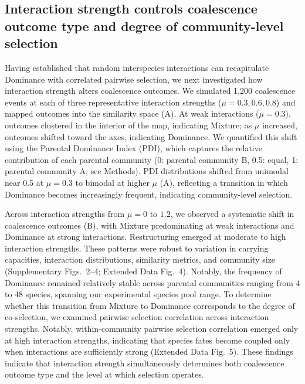 \subsection{Interaction strength controls coalescence outcome type and degree of community-level selection}
\label{sec:results:interaction_strength}

Having established that random interspecies interactions can recapitulate Dominance with correlated pairwise selection, we next investigated how interaction strength alters coalescence outcomes. We simulated 1,200 coalescence events at each of three representative interaction strengths ($\mu = 0.3, 0.6, 0.8$) and mapped outcomes into the similarity space (A). At weak interactions ($\mu = 0.3$), outcomes clustered in the interior of the map, indicating Mixture; as $\mu$ increased, outcomes shifted toward the axes, indicating Dominance. We quantified this shift using the Parental Dominance Index (PDI), which captures the relative contribution of each parental community (0: parental community B, 0.5: equal, 1: parental community A; see Methods). PDI distributions shifted from unimodal near 0.5 at $\mu = 0.3$ to bimodal at higher $\mu$ (A), reflecting a transition in which Dominance becomes increasingly frequent, indicating community-level selection.

Across interaction strengths from $\mu = 0$ to $1.2$, we observed a systematic shift in coalescence outcomes (B), with Mixture predominating at weak interactions and Dominance at strong interactions. Restructuring emerged at moderate to high interaction strengths. These patterns were robust to variation in carrying capacities, interaction distributions, similarity metrics, and community size (Supplementary Figs.~2–4; Extended Data Fig.~4). Notably, the frequency of Dominance remained relatively stable across parental communities ranging from 4 to 48 species, spanning our experimental species pool range. To determine whether this transition from Mixture to Dominance corresponds to the degree of co-selection, we examined pairwise selection correlation across interaction strengths. Notably, within-community pairwise selection correlation emerged only at high interaction strengths, indicating that species fates become coupled only when interactions are sufficiently strong (Extended Data Fig.~5). These findings indicate that interaction strength simultaneously determines both coalescence outcome type and the level at which selection operates.

